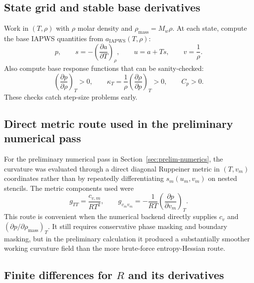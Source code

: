 \documentclass[12pt]{article}
\begin{document}
\subsection{State grid and stable base derivatives}

Work in $(T,\rho)$ with $\rho$ molar density and $\rho_{\mathrm{mass}}=M_w\rho$. At each state, compute the base IAPWS quantities from $a_{\mathrm{IAPWS}}(T,\rho)$:
\begin{equation}
  p,\qquad s=-\left(\frac{\partial a}{\partial T}\right)_\rho,\qquad u=a+Ts,
  \qquad v=\frac{1}{\rho}.
\end{equation}
Also compute base response functions that can be sanity-checked:
\begin{equation}
  \left(\frac{\partial p}{\partial\rho}\right)_T>0,
  \qquad \kappa_T=\frac{1}{\rho}\left(\frac{\partial\rho}{\partial p}\right)_T>0,
  \qquad C_p>0.
\end{equation}
These checks catch step-size problems early.


\subsection{Direct metric route used in the preliminary numerical pass}

For the preliminary numerical pass in Section~\ref{sec:prelim-numerics}, the curvature was evaluated through a direct diagonal Ruppeiner metric in $(T,v_m)$ coordinates rather than by repeatedly differentiating $s_m(u_m,v_m)$ on nested stencils. The metric components used were
\begin{equation}
  g_{TT}=\frac{c_{v,m}}{RT^2},
  \qquad
  g_{v_m v_m}=-\frac{1}{RT}\left(\frac{\partial p}{\partial v_m}\right)_T.
\end{equation}
This route is convenient when the numerical backend directly supplies $c_v$ and $(\partial p/\partial\rho_{\mathrm{mass}})_T$. It still requires conservative phase masking and boundary masking, but in the preliminary calculation it produced a substantially smoother working curvature field than the more brute-force entropy-Hessian route.

\subsection{Finite differences for $R$ and its derivatives}
\end{document}
